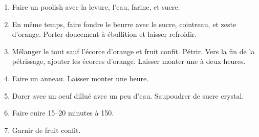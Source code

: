 
\begin{ingredients}
\end{ingredients}


\begin{recipe}
  \begin{enumerate}

  \item Faire un poolish avec la levure, l'eau, farine, et sucre.
    
  \item En même temps, faire fondre le beurre avec le sucre,
    cointreau, et zeste d'orange.  Porter doucement à ébullition et
    laisser refroidir.
    
  \item Mélanger le tout sauf l'écorce d'orange et fruit confit.
    Pétrir.  Vers la fin de la pétrissage, ajouter les écorces
    d'orange.  Laisser monter une à deux heures.

  \item Faire un anneau.  Laisser monter une heure.
    
  \item Dorer avec un oeuf dillué avec un peu d'eau.  Saupoudrer de
    sucre crystal.
    
  \item Faire cuire 15--20 minutes à 150\C.
    
  \item Garnir de fruit confit.

  \end{enumerate}
\end{recipe}

